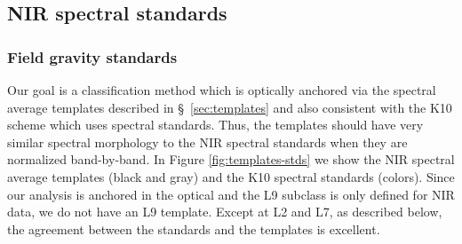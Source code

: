 \documentclass[12pt,preprint]{aastex}
\begin{document}
\subsection{NIR spectral standards}
\subsubsection{Field gravity standards}
\label{sec:field_stds}

Our goal is a classification method which is optically anchored via the spectral average templates described in \S~\ref{sec:templates} and also consistent with the K10 scheme which uses spectral standards. 
Thus, the templates should have very similar spectral morphology to the NIR spectral standards when they are normalized band-by-band.
In Figure \ref{fig:templates-stds} we show the NIR spectral average templates (black and gray) and the K10 spectral standards (colors). 
Since our analysis is anchored in the optical and the L9 subclass is only defined for NIR data, we do not have an L9 template.
Except at L2 and L7, as described below, the agreement between the standards and the templates is excellent.
\end{document}
